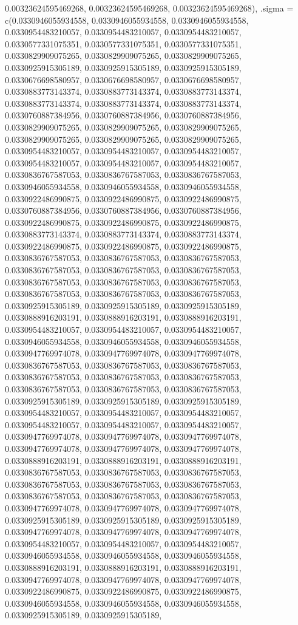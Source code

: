 \documentclass[
  ,man]{apa6}
\begin{document}
0.00323624595469268, 0.00323624595469268, 0.00323624595469268), .sigma = c(0.0330946055934558, 0.0330946055934558, 0.0330946055934558, 0.0330954483210057, 0.0330954483210057, 0.0330954483210057, 0.0330577331075351, 0.0330577331075351, 0.0330577331075351, 0.0330829909075265, 0.0330829909075265, 0.0330829909075265, 0.0330925915305189, 0.0330925915305189, 0.0330925915305189, 0.0330676698580957, 0.0330676698580957, 0.0330676698580957, 0.0330883773143374, 0.0330883773143374, 0.0330883773143374, 0.0330883773143374,
0.0330883773143374, 0.0330883773143374, 0.0330760887384956, 0.0330760887384956, 0.0330760887384956, 0.0330829909075265, 0.0330829909075265, 0.0330829909075265, 0.0330829909075265, 0.0330829909075265, 0.0330829909075265, 0.0330954483210057, 0.0330954483210057, 0.0330954483210057, 0.0330954483210057, 0.0330954483210057, 0.0330954483210057, 0.0330836767587053, 0.0330836767587053, 0.0330836767587053, 0.0330946055934558, 0.0330946055934558, 0.0330946055934558, 0.0330922486990875, 0.0330922486990875, 0.0330922486990875,
0.0330760887384956, 0.0330760887384956, 0.0330760887384956, 0.0330922486990875, 0.0330922486990875, 0.0330922486990875, 0.0330883773143374, 0.0330883773143374, 0.0330883773143374, 0.0330922486990875, 0.0330922486990875, 0.0330922486990875, 0.0330836767587053, 0.0330836767587053, 0.0330836767587053, 0.0330836767587053, 0.0330836767587053, 0.0330836767587053, 0.0330836767587053, 0.0330836767587053, 0.0330836767587053, 0.0330836767587053, 0.0330836767587053, 0.0330836767587053, 0.0330925915305189, 0.0330925915305189,
0.0330925915305189, 0.0330888916203191, 0.0330888916203191, 0.0330888916203191, 0.0330954483210057, 0.0330954483210057, 0.0330954483210057, 0.0330946055934558, 0.0330946055934558, 0.0330946055934558, 0.0330947769974078, 0.0330947769974078, 0.0330947769974078, 0.0330836767587053, 0.0330836767587053, 0.0330836767587053, 0.0330836767587053, 0.0330836767587053, 0.0330836767587053, 0.0330836767587053, 0.0330836767587053, 0.0330836767587053, 0.0330925915305189, 0.0330925915305189, 0.0330925915305189, 0.0330954483210057,
0.0330954483210057, 0.0330954483210057, 0.0330954483210057, 0.0330954483210057, 0.0330954483210057, 0.0330947769974078, 0.0330947769974078, 0.0330947769974078, 0.0330947769974078, 0.0330947769974078, 0.0330947769974078, 0.0330888916203191, 0.0330888916203191, 0.0330888916203191, 0.0330836767587053, 0.0330836767587053, 0.0330836767587053, 0.0330836767587053, 0.0330836767587053, 0.0330836767587053, 0.0330836767587053, 0.0330836767587053, 0.0330836767587053, 0.0330947769974078, 0.0330947769974078, 0.0330947769974078,
0.0330925915305189, 0.0330925915305189, 0.0330925915305189, 0.0330947769974078, 0.0330947769974078, 0.0330947769974078, 0.0330954483210057, 0.0330954483210057, 0.0330954483210057, 0.0330946055934558, 0.0330946055934558, 0.0330946055934558, 0.0330888916203191, 0.0330888916203191, 0.0330888916203191, 0.0330947769974078, 0.0330947769974078, 0.0330947769974078, 0.0330922486990875, 0.0330922486990875, 0.0330922486990875, 0.0330946055934558, 0.0330946055934558, 0.0330946055934558, 0.0330925915305189, 0.0330925915305189,
\end{document}

